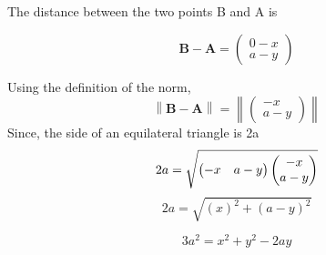 \documentclass[journal,12pt,twocolumn]{IEEEtran}
\providecommand{\norm}[1]{\left\lVert#1\right\rVert}
\let\vec\mathbf
\newcommand{\myvec}[1]{\ensuremath{\begin{pmatrix}#1\end{pmatrix}}}
\begin{document}






\noindent The distance between the two points B and A is

\begin{equation}	
\vec{B}-\vec{A} = \myvec{0-x \\ a-y}
\end{equation}

\noindent Using the definition   of the norm, 
		\begin{equation}
\norm{\vec{B}-\vec{A}} =\norm{\myvec{-x \\ a-y}}
\end{equation}
\noindent Since, the side of an equilateral triangle is 2a	
\begin{equation}						
			2a=\sqrt{\myvec{-x & a-y}\myvec{-x \\ a-y}} 
\\
\end{equation}
\begin{equation}						
2a =  \sqrt{(x)^2+ (a-y)^2}
\end{equation}
%

\begin{equation}
3a^2 = {x^2+y^2-2ay}
\label{eq-1-}
\end{equation}
\end{document}

